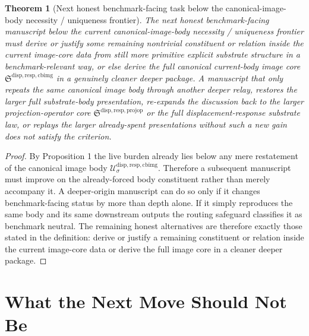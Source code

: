 \documentclass[11pt]{article}
\newcommand{\ProjectionOperatorCore}{\mathfrak S^{\mathrm{disp,resp,projop}}}
\newcommand{\CurrentBodyImageCore}{\mathfrak S^{\mathrm{disp,resp,cbimg}}}
\newcommand{\CanonicalImageBody}[1]{\mathcal U_{#1}^{\mathrm{disp,resp,cbimg}}}
\newtheorem{theorem}{Theorem}
\begin{document}
\begin{theorem}[Next honest benchmark-facing task below the canonical-image-body necessity / uniqueness frontier]
The next honest benchmark-facing manuscript below the current canonical-image-body necessity / uniqueness frontier must derive or justify some remaining nontrivial constituent or relation inside the current image-core data from still more primitive explicit substrate structure in a benchmark-relevant way, or else derive the full canonical current-body image core \(\CurrentBodyImageCore\) in a genuinely cleaner deeper package. A manuscript that only repeats the same canonical image body through another deeper relay, restores the larger full substrate-body presentation, re-expands the discussion back to the larger projection-operator core \(\ProjectionOperatorCore\) or the full displacement-response substrate law, or replays the larger already-spent presentations without such a new gain does not satisfy the criterion.
\end{theorem}

\begin{proof}
By Proposition 1 the live burden already lies below any mere restatement of the canonical image body \(\CanonicalImageBody{\sigma}\). Therefore a subsequent manuscript must improve on the already-forced body constituent rather than merely accompany it. A deeper-origin manuscript can do so only if it changes benchmark-facing status by more than depth alone. If it simply reproduces the same body and its same downstream outputs the routing safeguard classifies it as benchmark neutral. The remaining honest alternatives are therefore exactly those stated in the definition: derive or justify a remaining constituent or relation inside the current image-core data or derive the full image core in a cleaner deeper package.
\end{proof}

\section{What the Next Move Should Not Be}
\end{document}
